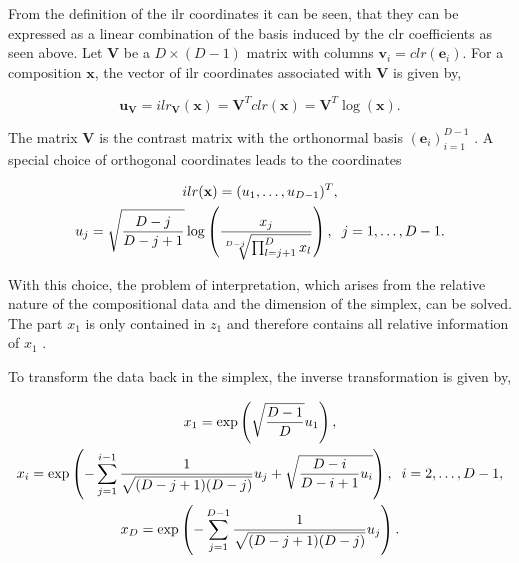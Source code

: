 From the definition of the ilr coordinates it can be seen, that they can be expressed as a linear combination of the basis induced by the clr coefficients as seen above. Let $\textbf{V}$ be a $D \times (D-1)$ matrix with columns $\textbf{v}_i = clr(\textbf{e}_i)$. For a composition $\textbf{x}$, the vector of ilr coordinates associated with $\textbf{V}$ is given by,

\begin{equation}
\textbf{u}_{\textbf{V}} = ilr_{\textbf{V}}(\textbf{x}) = \textbf{V}^T clr(\textbf{x}) = \textbf{V}^T \log(\textbf{x}). 
\label{eq:ilr coordinates with V}
\end{equation}

The matrix $\textbf{V}$ is the contrast matrix with the orthonormal basis $(\textbf{e}_i)_{i=1}^{D-1}$ \cite{Egozcue:2003}. A special choice of orthogonal coordinates leads to the coordinates 

\begin{equation}
\begin{gathered}
ilr(\textbf{x}) = (u_1,\ldots,u_{D-1})^T, \\
u_j = \sqrt{\frac{D-j}{D-j+1}}\log\left(\frac{x_j}{\sqrt[D-j]{\prod_{l=j+1}^D x_l}}\right), \hspace{0.2cm} j=1,\ldots, D-1.
\label{eq:pivot coordinates}
\end{gathered}
\end{equation}

With this choice, the problem of interpretation, which arises from the relative nature of the compositional data and the dimension of the simplex, can be solved. The part $x_1$ is only contained in $z_1$ and therefore contains all relative information of $x_1$ \cite{Filzmoser:2020}. 

To transform the data back in the simplex, the inverse transformation is given by, 

\begin{equation}
\begin{gathered}
x_1 = \exp\left(\sqrt{\frac{D-1}{D}}u_1\right), \\
x_i = \exp\left(- \sum_{j=1}^{i-1}\frac{1}{\sqrt{(D-j+1)(D-j)}}u_j + \sqrt{\frac{D-i}{D-i+1}u_i} \right), \hspace{0.2cm} i=2,\ldots, D-1, \\
x_D = \exp\left(- \sum_{j=1}^{D-1} \frac{1}{\sqrt{(D-j+1)(D-j)}}u_j \right).
\label{eq: Inverse Transformation}
\end{gathered}
\end{equation}

